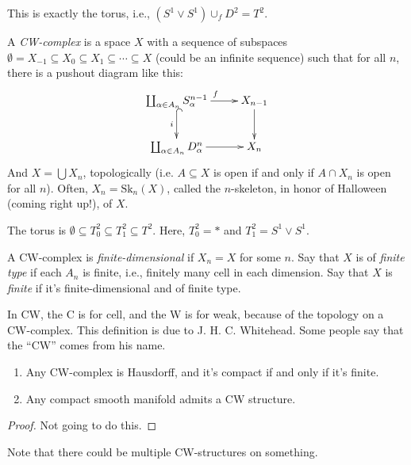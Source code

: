 This is exactly the torus, i.e., $(S^1\vee S^1)\cup_f D^2=T^2$.
\begin{definition}
A \emph{CW-complex} is a space $X$ with a sequence of subspaces $\emptyset=X_{-1}\subseteq X_0\subseteq X_1\subseteq\cdots\subseteq X$ (could be an infinite sequence) such that for all $n$, there is a pushout diagram like this:
\begin{equation*}
\xymatrix{\coprod_{\alpha\in A_n}S^{n-1}_\alpha\ar[r]^f\ar@{^(->}[d]_i & X_{n-1}\ar[d]\\
\coprod_{\alpha\in A_n}D^n_\alpha\ar[r] & X_{n}}
\end{equation*}
And $X=\bigcup X_n$, topologically (i.e. $A\subseteq X$ is open if and only if $A\cap X_n$ is open for all $n$). Often, $X_n=\mathrm{Sk}_n(X)$, called the $n$-skeleton, in honor of Halloween (coming right up!), of $X$.
\end{definition}
\begin{example}
The torus is $\emptyset\subseteq T^2_0\subseteq T^2_1\subseteq T^2$. Here, $T^2_0=\ast$ and $T^2_1=S^1\vee S^1$.
\end{example}
\begin{definition}
A CW-complex is \emph{finite-dimensional} if $X_n=X$ for some $n$. Say that $X$ is of \emph{finite type} if each $A_n$ is finite, i.e., finitely many cell in each dimension. Say that $X$ is \emph{finite} if it's finite-dimensional and of finite type.
\end{definition}
In CW, the C is for cell, and the W is for weak, because of the topology on a CW-complex. This definition is due to J. H. C. Whitehead. Some people say that the ``CW'' comes from his name.
\begin{theorem}
\begin{enumerate}
\item Any CW-complex is Hausdorff, and it's compact if and only if it's finite.
\item Any compact smooth manifold admits a CW structure.
\end{enumerate}
\end{theorem}
\begin{proof}
Not going to do this.
\end{proof}
Note that there could be multiple CW-structures on something.

